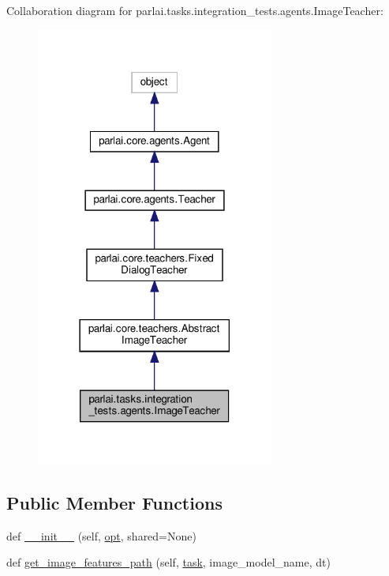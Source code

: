 Collaboration diagram for parlai.\+tasks.\+integration\+\_\+tests.\+agents.\+Image\+Teacher\+:
\nopagebreak
\begin{figure}[H]
\begin{center}
\leavevmode
\includegraphics[width=222pt]{da/da9/classparlai_1_1tasks_1_1integration__tests_1_1agents_1_1ImageTeacher__coll__graph}
\end{center}
\end{figure}
\subsection*{Public Member Functions}
\begin{DoxyCompactItemize}
\item 
def \hyperlink{classparlai_1_1tasks_1_1integration__tests_1_1agents_1_1ImageTeacher_a3341d0d235586140b1c0c231a21182ff}{\+\_\+\+\_\+init\+\_\+\+\_\+} (self, \hyperlink{classparlai_1_1core_1_1teachers_1_1AbstractImageTeacher_aa7ca0df94cb27a11487e40343cc84de6}{opt}, shared=None)
\item 
def \hyperlink{classparlai_1_1tasks_1_1integration__tests_1_1agents_1_1ImageTeacher_a73c89a1d9f05891ad2a749c81814b93e}{get\+\_\+image\+\_\+features\+\_\+path} (self, \hyperlink{classparlai_1_1core_1_1teachers_1_1AbstractImageTeacher_a78dca77e43183d22d75140ca113d821c}{task}, image\+\_\+model\+\_\+name, dt)
\end{DoxyCompactItemize}
